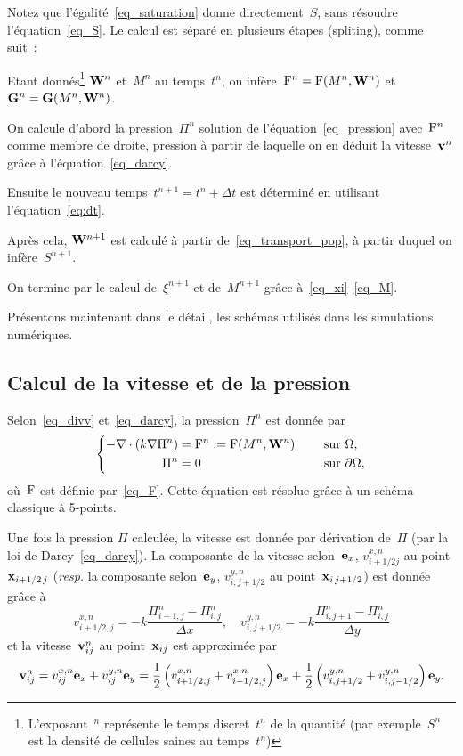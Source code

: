 \documentclass[main.tex]{subfiles}
\begin{document}
Notez que l'égalité~\eqref{eq_saturation} donne directement~$S$, sans résoudre l'équation~\eqref{eq_S}. Le calcul est séparé en plusieurs étapes  (spliting), comme suit~:
\begin{myitemize}
\item Etant donnés\footnote{L'exposant~$^n$ représente le temps discret~$t^n$ de la quantité 
(par exemple~$S^n$ est la densité de cellules saines au temps~$t^n$)}
${\bf W}^n$ et~$M^n$ au temps~$t^n$, on infère~${\rm F}^n={\rm F}(M^n,{\bf W}^n)$ et
${\bf G}^n={\bf G}(M^n,{\bf W}^n)$.
\item On calcule d'abord la pression~$\Pi^n$ solution de l'équation~\eqref{eq_pression} avec~${\rm F}^n$ comme membre de droite, pression à partir de laquelle on en  déduit la vitesse~$\mathbf{v}^n$ grâce à l'équation~\eqref{eq_darcy}.
\item Ensuite le nouveau temps~$t^{n+1}=t^n+\Delta t$ est déterminé en utilisant l'équation~\eqref{eq:dt}.
\item Après cela, ${\bf W}^{n+1}$ est calculé à partir de~\eqref{eq_transport_pop}, à partir duquel on infère~$S^{n+1}$.
\item On termine par le calcul de~$\xi^{n+1}$ et de~$M^{n+1}$ grâce à~\eqref{eq_xi}--\eqref{eq_M}.
\end{myitemize}
Présentons maintenant dans le détail, les schémas utilisés dans les simulations numériques.

\subsection{Calcul de la vitesse et de la pression} 


Selon~\eqref{eq_divv} et~\eqref{eq_darcy}, 
la pression~$\Pi^n$ est donnée par
\begin{equation}\label{eq_pression_disc}
\left\{
\begin{aligned}
-\nabla\cdot (k\nabla \Pi^n)&={\rm F}^n:={\rm F}(M^n,{\bf W}^n) & \quad \textrm{ sur } & \Omega , \\
\Pi^n &=0 & \quad \textrm{ sur } & \partial \Omega ,
\end{aligned}
\right.
\end{equation}
où~${\rm F}$ est définie par~\eqref{eq_F}. 
Cette équation est résolue grâce à un schéma classique à 5-points. 


Une fois la pression $\Pi$ calculée, la vitesse est donnée par dérivation de~$\Pi$ (par la loi de Darcy~\eqref{eq_darcy}).
La composante de la vitesse selon~${\bf e}_x$, $v^{x,n}_{i+1/2 j}$ au point 
$\mathbf{x}_{i+1/2\,j}$ ({\it resp.} la composante selon~${\bf e}_y$, $v^{y,n}_{i,
  j+1/2}$ au point~${\mathbf{x}_{i\,j+1/2}}$) est donnée grâce à
\begin{equation*}
v^{x,n}_{i+1/2,j} = -k \frac{\Pi^n_{i+1,j}-\Pi^n_{i,j}}{\Delta x},\quad
v^{y,n}_{i,j+1/2} = -k \frac{\Pi^n_{i,j+1}-\Pi^n_{i,j}}{\Delta y}
\end{equation*}
et la vitesse~$\mathbf{v}^n_{ij}$ au point~$\mathbf{x}_{ij}$ est approximée par
\begin{align}
  \label{eq_vit_discr}
  \mathbf{v}^n_{ij}=    v^{x,n}_{ij}{\bf e}_x
  +v^{y,n}_{ij}{\bf e}_y=\frac{1}{2}\left(v^{x,n}_{i+1/2,j}
    +v^{x,n}_{i-1/2,j} \right) {\bf e}_x+\frac{1}{2}\left(v^{y,n}_{i,j+1/2}
    +v^{y,n}_{i,j-1/2} \right) {\bf e}_y.
\end{align}
\end{document}

